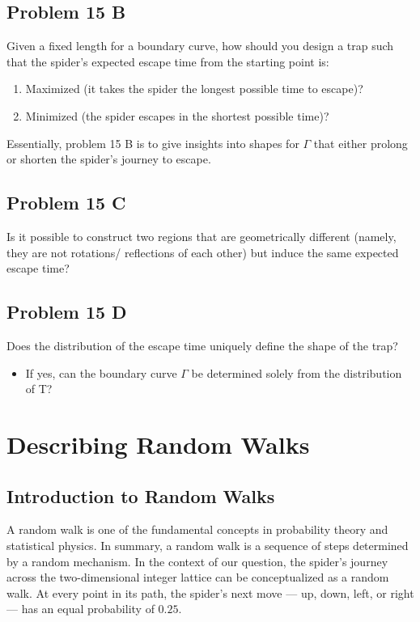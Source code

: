 \documentclass[12pt,a4paper]{article}
\begin{document}
\subsection{Problem 15 B}
Given a fixed length for a boundary curve, how should you design a trap such that the spider's expected escape time from the starting point is:
\begin{enumerate}
    \item Maximized (it takes the spider the longest possible time to escape)?
    \item Minimized (the spider escapes in the shortest possible time)?
\end{enumerate}

Essentially, problem 15 B is to give insights into shapes for $\Gamma$ that either prolong or shorten the spider's journey to escape.

\subsection{Problem 15 C}
Is it possible to construct two regions that are geometrically different (namely, they are not rotations/ reflections of each other) but induce the same expected escape time?

\subsection{Problem 15 D}
Does the distribution of the escape time uniquely define the shape of the trap?
\begin{itemize}
    \item If yes, can the boundary curve $\Gamma$ be determined solely from the distribution of T?
\end{itemize}

\section{Describing Random Walks}
\subsection{Introduction to Random Walks}
A random walk is one of the fundamental concepts in probability theory and statistical physics. In summary, a random walk is a sequence of steps determined by a random mechanism. In the context of our question, the spider's journey across the two-dimensional integer lattice can be conceptualized as a random walk. At every point in its path, the spider's next move — up, down, left, or right — has an equal probability of \(0.25\). 
\end{document}
